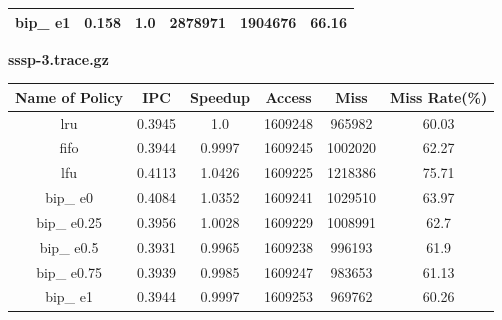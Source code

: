 \documentclass{article}
\begin{document}
\begin{description}
\begin{table}[H]
\begin{tabular}{|c|c|c|c|c|c|}
bip\_ e1 & 0.158 & 1.0 & 2878971 & 1904676 & 66.16 \\ \hline
\end{tabular}
\end{table}
  \item \textbf{sssp-3.trace.gz}\\
  \begin{table}[H]
  \centering
  \begin{tabular}{|c|c|c|c|c|c|}
  \hline
    \textbf{Name of Policy} & \textbf{IPC} & \textbf{Speedup} & \textbf{Access} & \textbf{Miss} & \textbf{Miss Rate(\%)}\\ \hline
lru & 0.3945 & 1.0 & 1609248 & 965982 & 60.03 \\ \hline
fifo & 0.3944 & 0.9997 & 1609245 & 1002020 & 62.27 \\ \hline
lfu & 0.4113 & 1.0426 & 1609225 & 1218386 & 75.71 \\ \hline
bip\_ e0 & 0.4084 & 1.0352 & 1609241 & 1029510 & 63.97 \\ \hline
bip\_ e0.25 & 0.3956 & 1.0028 & 1609229 & 1008991 & 62.7 \\ \hline
bip\_ e0.5 & 0.3931 & 0.9965 & 1609238 & 996193 & 61.9 \\ \hline
bip\_ e0.75 & 0.3939 & 0.9985 & 1609247 & 983653 & 61.13 \\ \hline
bip\_ e1 & 0.3944 & 0.9997 & 1609253 & 969762 & 60.26 \\ \hline
\end{tabular}
\end{table}

\end{description}
\end{document}
